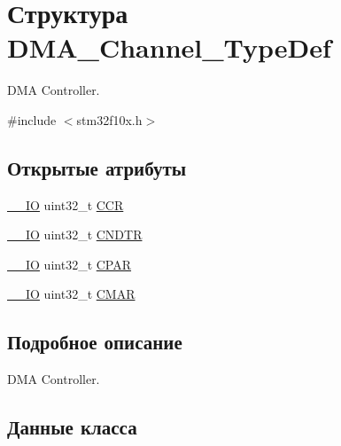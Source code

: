 \hypertarget{struct_d_m_a___channel___type_def}{}\section{Структура D\+M\+A\+\_\+\+Channel\+\_\+\+Type\+Def}
\label{struct_d_m_a___channel___type_def}


D\+MA Controller.  




{\ttfamily \#include $<$stm32f10x.\+h$>$}

\subsection*{Открытые атрибуты}
\begin{DoxyCompactItemize}
\item 
\mbox{\hyperlink{group___c_m_s_i_s___c_m3__core__definitions_gaec43007d9998a0a0e01faede4133d6be}{\+\_\+\+\_\+\+IO}} uint32\+\_\+t \mbox{\hyperlink{struct_d_m_a___channel___type_def_aa4938d438293f76ff6d9a262715c23eb}{C\+CR}}
\item 
\mbox{\hyperlink{group___c_m_s_i_s___c_m3__core__definitions_gaec43007d9998a0a0e01faede4133d6be}{\+\_\+\+\_\+\+IO}} uint32\+\_\+t \mbox{\hyperlink{struct_d_m_a___channel___type_def_af1c675e412fb96e38b6b4630b88c5676}{C\+N\+D\+TR}}
\item 
\mbox{\hyperlink{group___c_m_s_i_s___c_m3__core__definitions_gaec43007d9998a0a0e01faede4133d6be}{\+\_\+\+\_\+\+IO}} uint32\+\_\+t \mbox{\hyperlink{struct_d_m_a___channel___type_def_a8ce1c9c2742eaaa0e97ddbb3a06154cc}{C\+P\+AR}}
\item 
\mbox{\hyperlink{group___c_m_s_i_s___c_m3__core__definitions_gaec43007d9998a0a0e01faede4133d6be}{\+\_\+\+\_\+\+IO}} uint32\+\_\+t \mbox{\hyperlink{struct_d_m_a___channel___type_def_a7a9886b5f9e0edaf5ced3d1870b33ad7}{C\+M\+AR}}
\end{DoxyCompactItemize}


\subsection{Подробное описание}
D\+MA Controller. 

\subsection{Данные класса}
\mbox{\label{struct_d_m_a___channel___type_def_aa4938d438293f76ff6d9a262715c23eb}} 
